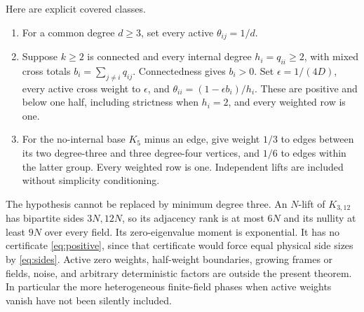 \documentclass[11pt]{article}
\begin{document}
Here are explicit covered classes.
\begin{enumerate}
\item For a common degree $d\ge3$, set every active $\theta_{ij}=1/d$.
\item Suppose $k\ge2$ is connected and every internal degree $h_i=q_{ii}\ge2$, with mixed cross totals $b_i=\sum_{j\ne i}q_{ij}$. Connectedness gives $b_i>0$. Set $\epsilon=1/(4D)$, every active cross weight to $\epsilon$, and $\theta_{ii}=(1-\epsilon b_i)/h_i$. These are positive and below one half, including strictness when $h_i=2$, and every weighted row is one.
\item For the no-internal base $K_5$ minus an edge, give weight $1/3$ to edges between its two degree-three and three degree-four vertices, and $1/6$ to edges within the latter group. Every weighted row is one. Independent lifts are included without simplicity conditioning.
\end{enumerate}
The hypothesis cannot be replaced by minimum degree three. An $N$-lift of $K_{3,12}$ has bipartite sides $3N,12N$, so its adjacency rank is at most $6N$ and its nullity at least $9N$ over every field. Its zero-eigenvalue moment is exponential. It has no certificate \eqref{eq:positive}, since that certificate would force equal physical side sizes by \eqref{eq:sides}. Active zero weights, half-weight boundaries, growing frames or fields, noise, and arbitrary deterministic factors are outside the present theorem. In particular the more heterogeneous finite-field phases when active weights vanish have not been silently included.
\end{document}
